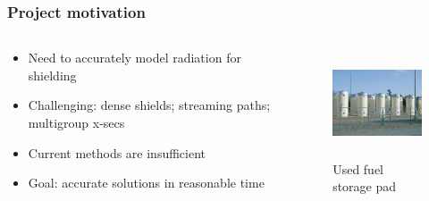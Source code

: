 \documentclass[xcolor=x11names,compress]{beamer}
\renewcommand{\(}{\begin{columns}}
\renewcommand{\)}{\end{columns}}
\newcommand{\<}[1]{\begin{column}{#1}}
\renewcommand{\>}{\end{column}}
\begin{document}
\begin{frame}[fragile]
  \frametitle{Project motivation}

\begin{columns}
  \begin{column}{0.55\textwidth}
	\begin{itemize}
	\item Need to accurately model radiation for shielding
	\item \alert{Challenging}: dense shields; streaming paths; multigroup x-secs
	\item Current methods are insufficient
	\item \alert{Goal}: accurate solutions in reasonable time
	\end{itemize}
  \end{column}
  \begin{column}{0.45\textwidth}
  	\begin{figure}
  	\begin{center}
  		\includegraphics[height=1.25in,clip]{../figs/isfsi}
		\caption{Used fuel storage pad}
	\end{center}
  	\end{figure}
  \end{column}
\end{columns}

\end{frame}
\end{document}

